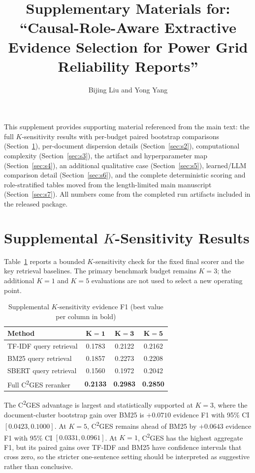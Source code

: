 \documentclass[11pt,letterpaper]{article}
\title{Supplementary Materials for:\\
``Causal-Role-Aware Extractive Evidence Selection for Power Grid Reliability Reports''}
\author{Bijing Liu and Yong Yang}
\date{}
\newcommand{\cges}{C\textsuperscript{2}GES}
\begin{document}
\maketitle

\noindent This supplement provides supporting material referenced from the main text: the full $K$-sensitivity results with per-budget paired bootstrap comparisons (Section~\ref{sec:s1}), per-document dispersion details (Section~\ref{sec:s2}), computational complexity (Section~\ref{sec:s3}), the artifact and hyperparameter map (Section~\ref{sec:s4}), an additional qualitative case (Section~\ref{sec:s5}), learned/LLM comparison detail (Section~\ref{sec:s6}), and the complete deterministic scoring and role-stratified tables moved from the length-limited main manuscript (Section~\ref{sec:s7}). All numbers come from the completed run artifacts included in the released package.

\section{Supplemental $K$-Sensitivity Results}
\label{sec:s1}

Table~\ref{tab:s1} reports a bounded $K$-sensitivity check for the fixed final scorer and the key retrieval baselines. The primary benchmark budget remains $K=3$; the additional $K=1$ and $K=5$ evaluations are not used to select a new operating point.

\begin{table}[ht]
\centering
\caption{Supplemental $K$-sensitivity evidence F1 (best value per column in bold)}
\label{tab:s1}
\begin{tabular}{lccc}
\toprule
\textbf{Method} & $\mathbf{K=1}$ & $\mathbf{K=3}$ & $\mathbf{K=5}$ \\
\midrule
TF-IDF query retrieval & 0.1783 & 0.2122 & 0.2162 \\
BM25 query retrieval & 0.1857 & 0.2273 & 0.2208 \\
SBERT query retrieval & 0.1560 & 0.1972 & 0.2042 \\
Full \cges{} reranker & \textbf{0.2133} & \textbf{0.2983} & \textbf{0.2850} \\
\bottomrule
\end{tabular}
\end{table}

The \cges{} advantage is largest and statistically supported at $K=3$, where the document-cluster bootstrap gain over BM25 is $+0.0710$ evidence F1 with 95\% CI $[0.0423, 0.1000]$. At $K=5$, \cges{} remains ahead of BM25 by $+0.0643$ evidence F1 with 95\% CI $[0.0331, 0.0961]$. At $K=1$, \cges{} has the highest aggregate F1, but its paired gains over TF-IDF and BM25 have confidence intervals that cross zero, so the stricter one-sentence setting should be interpreted as suggestive rather than conclusive.
\end{document}
